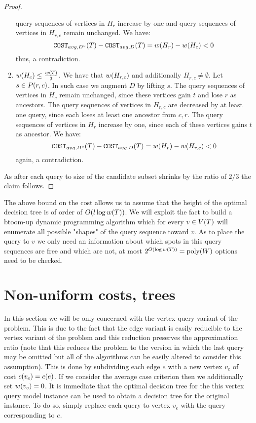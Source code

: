 \begin{theorem}
\begin{proof}
\begin{enumerate}
query sequences of vertices in $H_r$ increase by one and query sequences of vertices in $H_{r,c}$ remain unchanged. We have:
$$
\texttt{COST}_{avg, D^v}\mathopen{}\left( T \right)-\texttt{COST}_{avg, D}\mathopen{}\left( T \right)=w\mathopen{}\left( H_r \right)-w\mathopen{}\left( H_c \right)< 0
$$
thus, a contradiction.
\item $w\mathopen{}\left( H_c \right)\leq \frac{w\mathopen{}\left( T \right)}{3}$. We have that $w\mathopen{}\left( H_{r, c} \right)$ and additionally $H_{r, c}\neq\emptyset$. Let $s\in P\mathopen{}\left( r, c \right)$. In such case we augment $D$ by lifting $s$. The query sequences of vertices in
$H_{c}$ remain  unchanged, since these vertices gain $t$ and lose $r$ as ancestors. The query sequences of vertices in $H_{r,c}$ are
decreased by at least one query, since each loses at least one ancestor from ${c, r}$. The query sequences of
vertices in $H_r$ increase by one, since each of these vertices gains $t$ as ancestor. We have:
$$
\texttt{COST}_{avg, D^v}\mathopen{}\left( T \right)-\texttt{COST}_{avg, D}\mathopen{}\left( T \right)=w\mathopen{}\left( H_r \right)-w\mathopen{}\left( H_{r,c} \right)< 0
$$
again, a contradiction.
        \end{enumerate}
As after each query to size of the candidate subset shrinks by the ratio of $2/3$ the claim follows.
    \end{proof}
\end{theorem}
The above bound on the cost allows us to assume that the height of the optimal decision tree is of order of $O\mathopen{}\left( l\log w\mathopen{}\left( T \right) \right)$. We will exploit the fact to build a btoom-up dynamic programming algorithm which for every $v\in V\mathopen{}\left( T \right)$ will enumerate all possible "shapes" of the query sequence toward $v$. As to place the query to $v$ we only need an information about which spots in this query sequences are free and which are not, at most $2^{O\mathopen{}\left( \log w\mathopen{}\left( T \right) \right)}=\text{poly}\mathopen{}\left( W \right)$ options need to be checked. 
\section{Non-uniform costs, trees}
In this section we will be only concerned with the vertex-query variant of the problem. This is due to the fact that the edge variant is easily reducible to the vertex variant of the problem and this reduction preserves the approximation ratio (note that this reduces the problem to the version in which the last query may be omitted but all of the algorithms can be easily altered to consider this assumption). This is done by subdividing each edge $e$ with a new vertex $v_e$ of cost $c\mathopen{}\left( v_e \right)=c\mathopen{}\left( e \right)$. If we consider the average case criterion then we additionally set $w\mathopen{}\left( v_e \right)=0$. It is immediate that the optimal decision tree for the this vertex query model instance can be used to obtain a decision tree for the original instance. To do so, simply replace each query to vertex $v_e$ with the query corresponding to $e$. 

